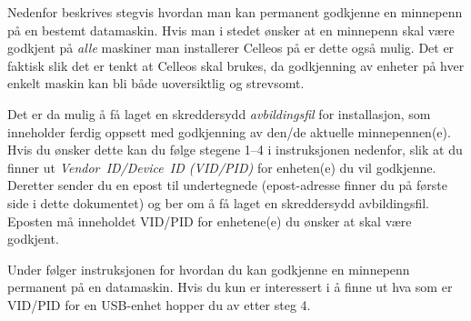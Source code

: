 Nedenfor beskrives stegvis hvordan man kan permanent godkjenne en minnepenn p\aa{} en bestemt datamaskin. Hvis man i stedet \o nsker at en minnepenn skal v\ae re godkjent p\aa{} {\it alle} maskiner man installerer Celleos p\aa{} er dette ogs\aa{} mulig. Det er faktisk slik det er tenkt at Celleos skal brukes, da godkjenning av enheter p\aa{} hver enkelt maskin kan bli b\aa de uoversiktlig og strevsomt.

Det er da mulig \aa{} f\aa{} laget en skreddersydd {\it avbildingsfil} for installasjon, som inneholder ferdig oppsett med godkjenning av den/de aktuelle minnepennen(e). Hvis du \o nsker dette kan du f\o lge stegene 1--4 i instruksjonen nedenfor, slik at du finner ut {\it Vendor~ID/Device~ID (VID/PID)\/} for enheten(e) du vil godkjenne. Deretter sender du en epost til undertegnede (epost-adresse finner du p\aa{} f\o rste side i dette dokumentet) og ber om \aa{} f\aa{} laget en skreddersydd avbildingsfil. Eposten m\aa{} inneholdet VID/PID for enhetene(e) du \o nsker at skal v\ae re godkjent. 

Under f\o lger instruksjonen for hvordan du kan godkjenne en minnepenn permanent p\aa{} en datamaskin. Hvis du kun er interessert i \aa{} finne ut hva som er VID/PID for en USB-enhet hopper du av etter steg 4.

